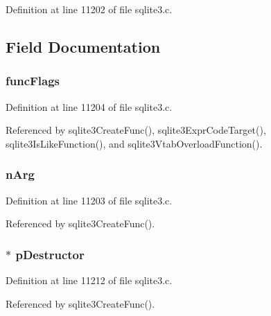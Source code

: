 Definition at line 11202 of file sqlite3.\+c.



\subsection{Field Documentation}
\hypertarget{struct_func_def_a046acf0266e49bab3fee2be79eee4993}{}
\subsubsection[{func\+Flags}]{ func\+Flags}\label{struct_func_def_a046acf0266e49bab3fee2be79eee4993}


Definition at line 11204 of file sqlite3.\+c.



Referenced by sqlite3\+Create\+Func(), sqlite3\+Expr\+Code\+Target(), sqlite3\+Is\+Like\+Function(), and sqlite3\+Vtab\+Overload\+Function().

\hypertarget{struct_func_def_a40bc3848b668eb072f0a52f662d78d9a}{}
\subsubsection[{n\+Arg}]{ n\+Arg}\label{struct_func_def_a40bc3848b668eb072f0a52f662d78d9a}


Definition at line 11203 of file sqlite3.\+c.



Referenced by sqlite3\+Create\+Func().

\hypertarget{struct_func_def_ad1dfb003b093e5f8b868da1d6676c484}{}
\subsubsection[{p\+Destructor}]{$\ast$ p\+Destructor}\label{struct_func_def_ad1dfb003b093e5f8b868da1d6676c484}


Definition at line 11212 of file sqlite3.\+c.



Referenced by sqlite3\+Create\+Func().

